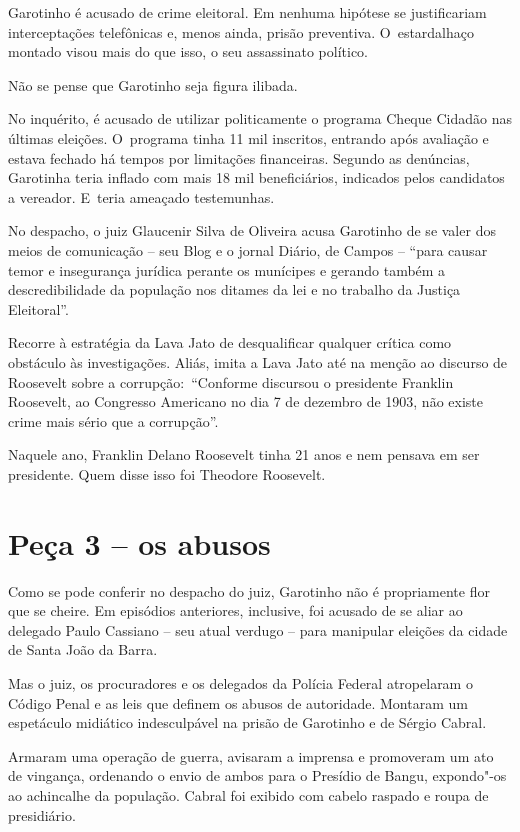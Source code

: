 Garotinho é acusado de crime eleitoral. Em nenhuma hipótese se
justificariam interceptações telefônicas e, menos ainda, prisão
preventiva. O~estardalhaço montado visou mais do que isso, o seu
assassinato político.

Não se pense que Garotinho seja figura ilibada.

No inquérito, é acusado de utilizar politicamente o programa Cheque
Cidadão nas últimas eleições. O~programa tinha 11 mil inscritos,
entrando após avaliação e estava fechado há tempos por limitações
financeiras. Segundo as denúncias, Garotinha teria inflado com mais 18
mil beneficiários, indicados pelos candidatos a vereador. E~teria
ameaçado testemunhas.

No despacho, o juiz Glaucenir Silva de Oliveira acusa Garotinho de se
valer dos meios de comunicação -- seu Blog e o jornal Diário, de Campos
-- ``para causar temor e insegurança jurídica perante os munícipes e
gerando também a descredibilidade da população nos ditames da lei e no
trabalho da Justiça Eleitoral''.

Recorre à estratégia da Lava Jato de desqualificar qualquer crítica como
obstáculo às investigações. Aliás, imita a Lava Jato até na menção ao
discurso de Roosevelt sobre a corrupção:~``Conforme discursou o
presidente Franklin Roosevelt, ao Congresso Americano no dia 7 de
dezembro de 1903, não existe crime mais sério que a corrupção''.

Naquele ano, Franklin Delano Roosevelt tinha 21 anos e nem pensava em
ser presidente. Quem disse isso foi Theodore Roosevelt.

\section{Peça 3 -- os abusos}

Como se pode conferir no despacho do juiz, Garotinho não é propriamente
flor que se cheire. Em episódios anteriores, inclusive, foi acusado de
se aliar ao delegado Paulo Cassiano -- seu atual verdugo -- para
manipular eleições da cidade de Santa João da Barra.

Mas o juiz, os procuradores e os delegados da Polícia Federal
atropelaram o Código Penal e as leis que definem os abusos de
autoridade. Montaram um espetáculo midiático indesculpável na prisão de
Garotinho e de Sérgio Cabral.

Armaram uma operação de guerra, avisaram a imprensa e promoveram um ato
de vingança, ordenando o envio de ambos para o Presídio de Bangu,
expondo"-os ao achincalhe da população. Cabral foi exibido com cabelo
raspado e roupa de presidiário.

